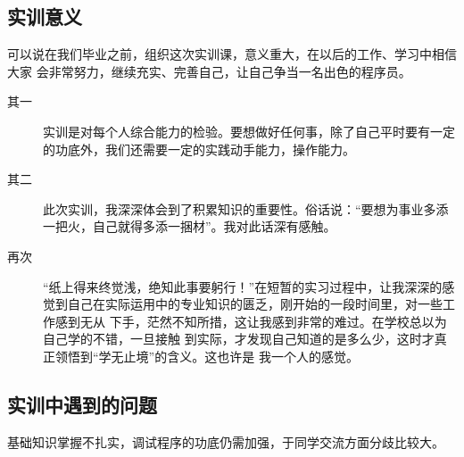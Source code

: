 \documentclass[12pt, a4paper, titlepage]{article}
\begin{document}
\subsection{实训意义}
	可以说在我们毕业之前，组织这次实训课，意义重大，在以后的工作、学习中相信大家
	会非常努力，继续充实、完善自己，让自己争当一名出色的程序员。
\begin{description}
	\item[其一]实训是对每个人综合能力的检验。要想做好任何事，除了自己平时要有一定
	的功底外，我们还需要一定的实践动手能力，操作能力。
	\item[其二]此次实训，我深深体会到了积累知识的重要性。俗话说：“要想为事业多添
	一把火，自己就得多添一捆材”。我对此话深有感触。
	\item[再次]“纸上得来终觉浅，绝知此事要躬行！”在短暂的实习过程中，让我深深的感
	觉到自己在实际运用中的专业知识的匮乏，刚开始的一段时间里，对一些工作感到无从
	下手，茫然不知所措，这让我感到非常的难过。在学校总以为自己学的不错，一旦接触
	到实际，才发现自己知道的是多么少，这时才真正领悟到“学无止境”的含义。这也许是
	我一个人的感觉。
\end{description}

\subsection{实训中遇到的问题}
	基础知识掌握不扎实，调试程序的功底仍需加强，于同学交流方面分歧比较大。
\end{document}

